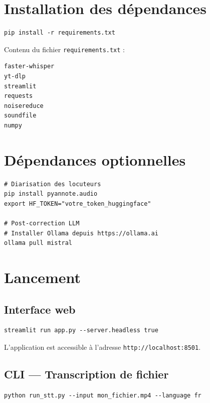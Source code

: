 \documentclass[12pt,a4paper]{report}
\begin{document}
\section{Installation des dépendances}

\begin{lstlisting}[style=bash, title=Installation des dépendances Python]
pip install -r requirements.txt
\end{lstlisting}

Contenu du fichier \texttt{requirements.txt} :
\begin{lstlisting}[title=requirements.txt]
faster-whisper
yt-dlp
streamlit
requests
noisereduce
soundfile
numpy
\end{lstlisting}

\section{Dépendances optionnelles}

\begin{lstlisting}[style=bash, title=Installation des composants optionnels]
# Diarisation des locuteurs
pip install pyannote.audio
export HF_TOKEN="votre_token_huggingface"

# Post-correction LLM
# Installer Ollama depuis https://ollama.ai
ollama pull mistral
\end{lstlisting}

\section{Lancement}

\subsection{Interface web}
\begin{lstlisting}[style=bash]
streamlit run app.py --server.headless true
\end{lstlisting}

L'application est accessible à l'adresse \texttt{http://localhost:8501}.

\subsection{CLI — Transcription de fichier}
\begin{lstlisting}[style=bash]
python run_stt.py --input mon_fichier.mp4 --language fr
\end{lstlisting}
\end{document}
